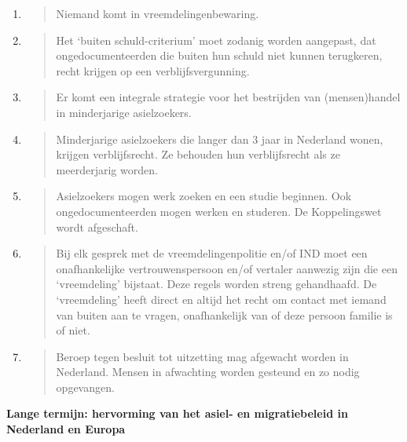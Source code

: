 \begin{enumerate}
\begin{quote}
  \end{quote}
\item
  \begin{quote}
  Niemand komt in vreemdelingenbewaring.
  \end{quote}
\item
  \begin{quote}
  Het `buiten schuld-criterium' moet zodanig worden aangepast, dat
  ongedocumenteerden die buiten hun schuld niet kunnen terugkeren, recht
  krijgen op een verblijfsvergunning.
  \end{quote}
\item
  \begin{quote}
  Er komt een integrale strategie voor het bestrijden van (mensen)handel
  in minderjarige asielzoekers.
  \end{quote}
\item
  \begin{quote}
  Minderjarige asielzoekers die langer dan 3 jaar in Nederland wonen,
  krijgen verblijfsrecht. Ze behouden hun verblijfsrecht als ze
  meerderjarig worden.
  \end{quote}
\item
  \begin{quote}
  Asielzoekers mogen werk zoeken en een studie beginnen. Ook
  ongedocumenteerden mogen werken en studeren. De Koppelingswet wordt
  afgeschaft.
  \end{quote}
\item
  \begin{quote}
  Bij elk gesprek met de vreemdelingenpolitie en/of IND moet een
  onafhankelijke vertrouwenspersoon en/of vertaler aanwezig zijn die een
  `vreemdeling' bijstaat. Deze regels worden streng gehandhaafd. De
  `vreemdeling' heeft direct en altijd het recht om contact met iemand
  van buiten aan te vragen, onafhankelijk van of deze persoon familie is
  of niet.
  \end{quote}
\item
  \begin{quote}
  Beroep tegen besluit tot uitzetting mag afgewacht worden in Nederland.
  Mensen in afwachting worden gesteund en zo nodig opgevangen.
  \end{quote}
\end{enumerate}

\textbf{Lange termijn: hervorming van het asiel- en migratiebeleid in
Nederland en Europa}

